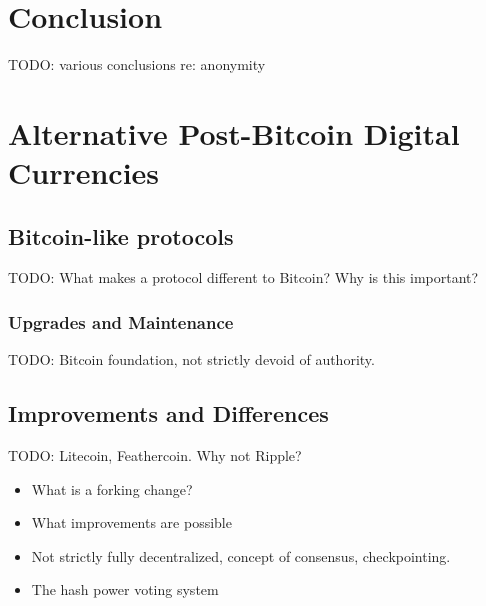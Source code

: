 \section{Conclusion}
TODO: various conclusions re: anonymity


\section{Alternative Post-Bitcoin Digital Currencies}

\subsection{Bitcoin-like protocols}
TODO: What makes a protocol different to Bitcoin? Why is this important?

\subsubsection{Upgrades and Maintenance}
TODO: Bitcoin foundation, not strictly devoid of authority.

\subsection{Improvements and Differences}
TODO: Litecoin, Feathercoin. Why not Ripple?

\begin{itemize} \item What is a forking change?  \item What improvements are
possible \item Not strictly fully decentralized, concept of consensus,
checkpointing.  \item The hash power voting system \end{itemize}


%
%

